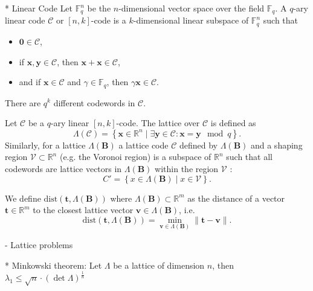 \documentclass[
  a4paper,  %
  twoside,  %
  bibliography=totoc,
  headsepline,
  cleardoublepage=empty,
  parskip=half,
  draft=false
]{scrbook}
\begin{document}
* Linear Code \cite{VanLint12} %
Let $\mathbb{F}_q^n$ be the $n$-dimensional vector space over the field $\mathbb{F}_q$. A $q$-ary linear code $\mathcal{C}$ or $[n, k]$-code is a $k$-dimensional linear subspace of $\mathbb{F}_q^n$ such that
\begin{itemize}
  \item $\mathbf{0} \in \mathcal{C}$,
  \item if $\mathbf{x}, \mathbf{y} \in \mathcal{C}$, then $\mathbf{x} + \mathbf{x} \in \mathcal{C}$,
  \item and if $\mathbf{x} \in \mathcal{C}$ and $\gamma \in \mathbb{F}_q$, then $\gamma \mathbf{x} \in \mathcal{C}$.
\end{itemize}
There are $q^k$ different codewords in $\mathcal{C}$.

Let $\mathcal{C}$ be a $q$-ary linear $[n, k]$-code. The lattice over $\mathcal{C}$ is defined as %
\begin{equation}
  \Lambda(\mathcal{C}) = \left\{ \mathbf{x} \in \mathbb{R}^n \mid \exists \mathbf{y} \in \mathcal{C} : \mathbf{x} = \mathbf{y} \mod q  \right\}.
\end{equation} %
Similarly, for a lattice $\Lambda(\mathbf{B})$ a lattice code $\mathcal{C}$ defined by $\Lambda(\mathbf{B})$ and a shaping region $\mathcal{V} \subset \mathbb{R}^n$ (e.g. the Voronoi region) is a subspace of $\mathbb{R}^n$ such that all codewords are lattice vectors in $\Lambda(\mathbf{B})$ within the region $\mathcal{V}$ \cite{SFS08}:
\begin{equation}
  C' = \left\{ x \in \Lambda(\mathbf{B}) \mid x \in \mathcal{V} \right\}.
\end{equation} %



We define $\text{dist}(\mathbf{t}, \Lambda(\mathbf{B}))$ where $\Lambda(\mathbf{B}) \subset \mathbb{R}^m$ as the distance of a vector $\mathbf{t} \in \mathbb{R}^m$ to the closest lattice vector $\mathbf{v} \in \Lambda(\mathbf{B})$, i.e.
\begin{equation}\label{eq:dist}
  \text{dist}(\mathbf{t}, \Lambda(\mathbf{B})) = \min_{\mathbf{v} \in \Lambda(\mathbf{B})}\|\mathbf{t} -  \mathbf{v}\|.
\end{equation}




- Lattice problems

* Minkowski theorem: Let $\Lambda$ be a lattice of dimension $n$, then $\lambda_1 \leq \sqrt{n} \cdot (\det \Lambda)^{\frac{1}{n}}$
\end{document}
